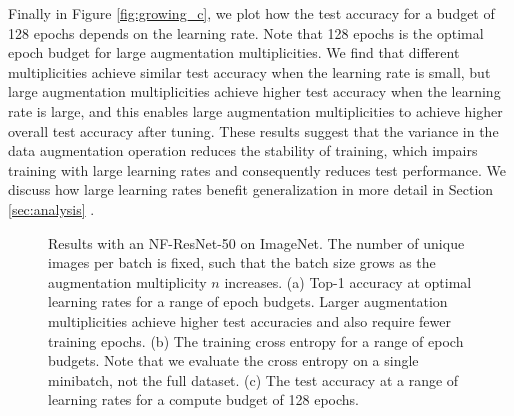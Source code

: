 \documentclass{article}
\begin{document}
Finally in Figure \ref{fig:growing_c}, we plot how the test accuracy for a budget of 128 epochs depends on the learning rate. Note that 128 epochs is the optimal epoch budget for large augmentation multiplicities. We find that different multiplicities achieve similar test accuracy when the learning rate is small, but large augmentation multiplicities achieve higher test accuracy when the learning rate is large, and this enables large augmentation multiplicities to achieve higher overall test accuracy after tuning. These results suggest that the variance in the data augmentation operation reduces the stability of training, which impairs training with large learning rates and consequently reduces test performance. We discuss how large learning rates benefit generalization in more detail in Section \ref{sec:analysis} \citep{li2019towards, smith2021origin}.
\begin{figure}[t]
\centering
  \vskip -3mm
  \vskip -2.5mm
\caption{Results with an NF-ResNet-50 on ImageNet. The number of unique images per batch is fixed, such that the batch size grows as the augmentation multiplicity $n$ increases. (a) Top-1 accuracy at optimal learning rates for a range of epoch budgets. Larger augmentation multiplicities achieve higher test accuracies and also require fewer training epochs.
(b) The training cross entropy for a range of epoch budgets. Note that we evaluate the cross entropy on a single minibatch, not the full dataset.
(c) The test accuracy at a range of learning rates for a compute budget of 128 epochs.
}
\label{fig:growing:imagenet}
  \vskip -2.5mm
\end{figure}
\end{document}
